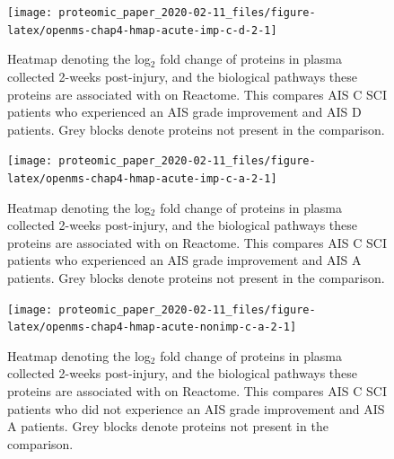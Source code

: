 \documentclass[9pt,lineno]{elife}
\newcommand{\blandscape}{\begin{landscape}}
\newcommand{\elandscape}{\end{landscape}}
\begin{document}
\begin{landscape}
\begin{landscape}
\begin{landscape}
\elandscape
\blandscape



\begin{figure}

{\centering \texttt{[image: proteomic\_paper\_2020-02-11\_files/figure-latex/openms-chap4-hmap-acute-imp-c-d-2-1]} 

}

\caption[Heatmap - label-free - Acute C Improvers VS Acute D]{Heatmap denoting the log\(_2\) fold change of proteins in plasma collected 2-weeks post-injury, and the biological pathways these proteins are associated with on Reactome. This compares AIS C SCI patients who experienced an AIS grade improvement and AIS D patients. Grey blocks denote proteins not present in the comparison.}\label{fig:openms-chap4-hmap-acute-imp-c-d-2}
\end{figure}

\elandscape
\blandscape



\begin{figure}

{\centering \texttt{[image: proteomic\_paper\_2020-02-11\_files/figure-latex/openms-chap4-hmap-acute-imp-c-a-2-1]} 

}

\caption[Heatmap - label-free - Acute A VS Acute C Improvers]{Heatmap denoting the log\(_2\) fold change of proteins in plasma collected 2-weeks post-injury, and the biological pathways these proteins are associated with on Reactome. This compares AIS C SCI patients who experienced an AIS grade improvement and AIS A patients. Grey blocks denote proteins not present in the comparison.}\label{fig:openms-chap4-hmap-acute-imp-c-a-2}
\end{figure}

\elandscape
\blandscape



\begin{figure}

{\centering \texttt{[image: proteomic\_paper\_2020-02-11\_files/figure-latex/openms-chap4-hmap-acute-nonimp-c-a-2-1]} 

}

\caption[Heatmap - label-free - Acute A VS Acute C Non-Improvers]{Heatmap denoting the log\(_2\) fold change of proteins in plasma collected 2-weeks post-injury, and the biological pathways these proteins are associated with on Reactome. This compares AIS C SCI patients who did not experience an AIS grade improvement and AIS A patients. Grey blocks denote proteins not present in the comparison.}\label{fig:openms-chap4-hmap-acute-nonimp-c-a-2}
\end{figure}


\end{landscape}
\end{landscape}
\end{landscape}
\end{document}
